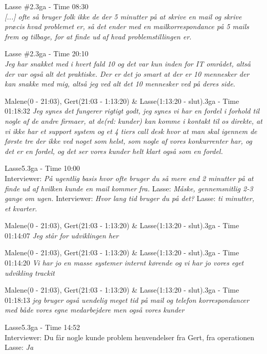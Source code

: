 \begin{thebibliography}{9}
	Lasse \#2.3ga - Time 08:30\\
	\textit{[...] ofte så bruger folk ikke de der 5 minutter på at skrive en mail og skrive præcis hvad problemet er, så det ender med en mailkorrespondance på 5 mails frem og tilbage, for at finde ud af hvad problemstillingen er.}

	Lasse \#2.3ga - Time 20:10\\
	\textit{Jeg har snakket med i hvert fald 10 og det var kun inden for IT området, altså der var også alt det praktiske. Der er det jo smart at der er 10 mennesker der kan snakke med mig, altså jeg ved alt det 10 mennesker ved på deres side.}

	Malene(0 - 21:03), Gert(21:03 - 1:13:20) \& Lasse(1:13:20 - slut).3ga - Time 01:18:32
	\textit{Jeg synes det fungerer rigtigt godt, jeg synes vi har en fordel i forhold til nogle af de andre firmaer, at de\emph{(rd: kunder)} kan komme i kontakt til os direkte, at vi ikke har et support system og et 4 tiers call desk hvor at man skal igennem de første tre der ikke ved noget som helst, som nogle af vores konkurrenter har, og det er en fordel, og det ser vores kunder helt klart også som en fordel.}

	Lasse5.3ga - Time 10:00 \\
	Interviewer: \textit{På ugentlig basis hvor ofte bruger du så mere end 2 minutter på at finde ud af hvilken kunde en mail kommer fra.} Lasse: \textit{Måske, gennemsnitlig 2-3 gange om ugen.} Interviewer: \textit{Hvor lang tid bruger du på det?} Lasse: \textit{ti minutter, et kvarter.}

	Malene(0 - 21:03), Gert(21:03 - 1:13:20) \& Lasse(1:13:20 - slut).3ga - Time 01:14:07
	\textit{Jeg står for udviklingen her}

	Malene(0 - 21:03), Gert(21:03 - 1:13:20) \& Lasse(1:13:20 - slut).3ga - Time 01:14:20
	\textit{Vi har jo en masse systemer internt kørende og vi har jo vores eget udvikling trackit}

	Malene(0 - 21:03), Gert(21:03 - 1:13:20) \& Lasse(1:13:20 - slut).3ga - Time 01:18:13
	\textit{jeg bruger også uendelig meget tid på mail og telefon korrespondancer med både vores egne medarbejdere men også vores kunder}

	Lasse5.3ga - Time 14:52 \\
	Interviewer: Du får nogle kunde problem henvendelser fra Gert, fra operationen
Lasse: \textit{Ja}


\end{thebibliography}
